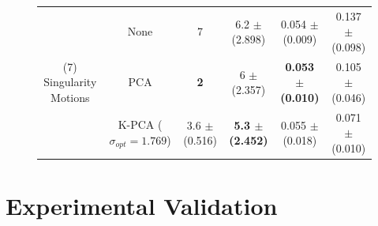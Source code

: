 \documentclass[letterpaper, 10 pt, conference,fleqn]{ieeeconf}
\begin{document}
\begin{figure}[!ht]
\begin{minipage}[b]{0.69\textwidth}
{\begin{tabular}{cc|cc|cc}
	\multicolumn{1}{c}{\multirow{3}{*}{(7) Singularity Motions}} & None & 7 & 6.2 $\pm$ (2.898) & 0.054 $\pm$ (0.009) & 0.137 $\pm$ (0.098)  \\
    \multicolumn{1}{c}{\multirow{3}{*}{($N=10,M=1467$)}} & PCA & \textbf{2} & 6 $\pm$ (2.357) & \textbf{ 0.053 $\pm$ (0.010) } & \cellcolor{blue!10} 0.105 $\pm$ (0.046) \\	
	& K-PCA ($\sigma_{opt} = 1.769$) & 3.6 $\pm$ (0.516) & \textbf{5.3 $\pm$ (2.452)} & 0.055 $\pm$ (0.018) & \cellcolor{blue!15} 0.071 $\pm$ (0.010)   \\ \hline\hline
\end{tabular}}
    \end{minipage}
    \vspace{-20pt}
\end{figure}





\section{Experimental Validation} \label{Sec:Exp}
\end{document}
